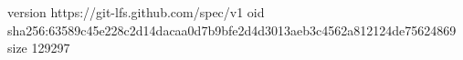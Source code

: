 version https://git-lfs.github.com/spec/v1
oid sha256:63589c45e228c2d14dacaa0d7b9bfe2d4d3013aeb3c4562a812124de75624869
size 129297
